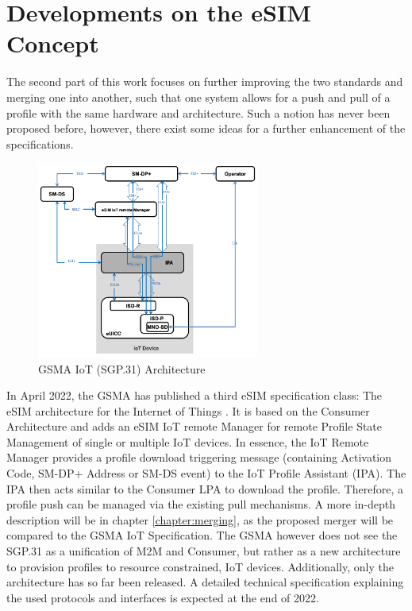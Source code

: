 
\section{Developments on the eSIM Concept}

The second part of this work focuses on further improving the two standards and merging one into another, such that one system allows for a push and pull of a profile with the same hardware and architecture. Such a notion has never been proposed before, however, there exist some ideas for a further enhancement of the specifications.


\begin{figure}[ht]
    \centering
    \includegraphics[width=0.65\textwidth]{pictures/iot_architecture.png}
    \caption{GSMA IoT (SGP.31) Architecture \parencite{SGP:31}}
    \label{fig:iot_arch}
\end{figure}
In April 2022, the GSMA has published a third eSIM specification class: The eSIM architecture for the Internet of Things \parencite{SGP:31}. It is based on the Consumer Architecture and adds an eSIM IoT remote Manager for remote Profile State Management of single or multiple IoT devices. In essence, the IoT Remote Manager provides a profile download triggering message (containing Activation Code, SM-DP+ Address or SM-DS event) to the IoT Profile Assistant (IPA). The IPA then acts similar to the Consumer LPA to download the profile. Therefore, a profile push can be managed via the existing pull mechanisms. A more in-depth description will be in chapter \ref{chapter:merging}, as the proposed merger will be compared to the GSMA IoT Specification. The GSMA however does not see the SGP.31 as a unification of M2M and Consumer, but rather as a new architecture to provision profiles to resource constrained, IoT devices. Additionally, only the architecture has so far been released. A detailed technical specification explaining the used protocols and interfaces is expected at the end of 2022.

